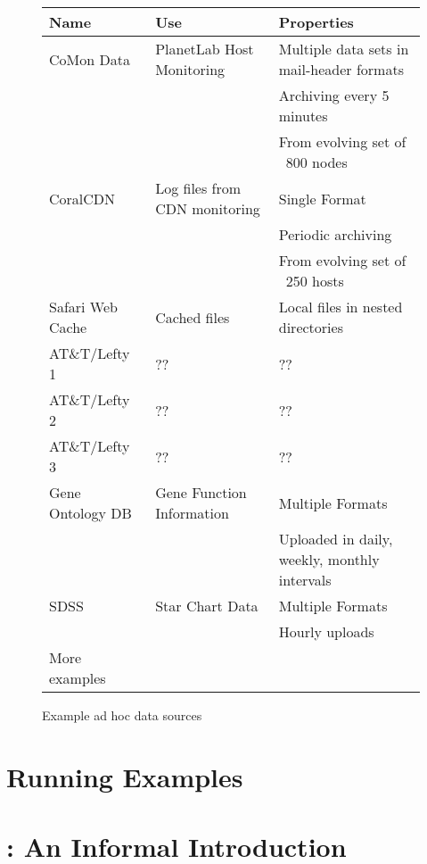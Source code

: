 \documentclass[nocopyrightspace]{sigplanconf}
\begin{document}
\begin{figure*}
\begin{center}
\begin{tabular}{|l|l|l|}
\hline\hline
Name & Use & Properties 
\\\hline\hline
CoMon Data & PlanetLab Host Monitoring & Multiple data sets in mail-header formats\\
                                       && Archiving every 5 minutes \\
                                       && From evolving set of ~800 nodes \\\hline
CoralCDN & Log files from CDN monitoring & Single Format \\
                                       && Periodic archiving \\
                                       && From evolving set of ~250 hosts \\\hline
Safari Web Cache & Cached files        & Local files in nested directories \\\hline
AT\&T/Lefty 1 & ?? & ?? \\\hline
AT\&T/Lefty 2 & ?? & ?? \\\hline
AT\&T/Lefty 3 & ?? & ?? \\\hline
Gene Ontology DB & Gene Function Information & Multiple Formats \\
                                             && Uploaded in daily, weekly, monthly intervals \\\hline
SDSS & Star Chart Data & Multiple Formats \\
                       && Hourly uploads \\\hline
More examples & & \\
\hline\hline
\end{tabular}
\end{center}
\caption{Example ad hoc data sources}
\label{fig:exampledata}
\end{figure*}

\section{Running Examples}
\label{sec:examples}


\section{\padsd{}: An Informal Introduction}
\label{sec:informal}

\end{document}
